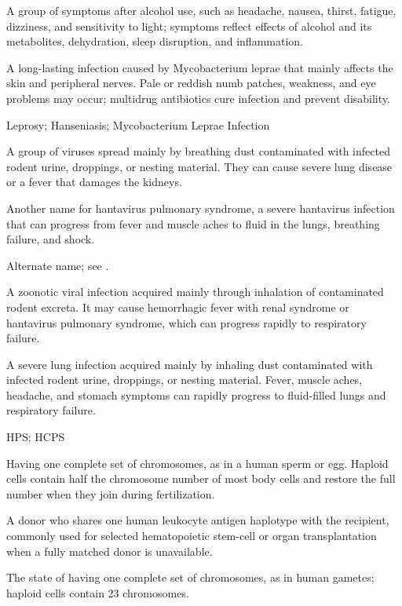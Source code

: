  A group of symptoms after alcohol use, such as headache, nausea, thirst, fatigue, dizziness, and sensitivity to light; symptoms reflect effects of alcohol and its metabolites, dehydration, sleep disruption, and inflammation.

 A long-lasting infection caused by Mycobacterium leprae that mainly affects the skin and peripheral nerves. Pale or reddish numb patches, weakness, and eye problems may occur; multidrug antibiotics cure infection and prevent disability.

\synonyms
Leprosy; Hanseniasis; Mycobacterium Leprae Infection

 A group of viruses spread mainly by breathing dust contaminated with infected rodent urine, droppings, or nesting material. They can cause severe lung disease or a fever that damages the kidneys.

 Another name for hantavirus pulmonary syndrome, a severe hantavirus infection that can progress from fever and muscle aches to fluid in the lungs, breathing failure, and shock.

 Alternate name; see .

 A zoonotic viral infection acquired mainly through inhalation of contaminated rodent excreta. It may cause hemorrhagic fever with renal syndrome or hantavirus pulmonary syndrome, which can progress rapidly to respiratory failure.

 A severe lung infection acquired mainly by inhaling dust contaminated with infected rodent urine, droppings, or nesting material. Fever, muscle aches, headache, and stomach symptoms can rapidly progress to fluid-filled lungs and respiratory failure.

\synonyms
HPS; HCPS

 Having one complete set of chromosomes, as in a human sperm or egg. Haploid cells contain half the chromosome number of most body cells and restore the full number when they join during fertilization.

 A donor who shares one human leukocyte antigen haplotype with the recipient, commonly used for selected hematopoietic stem-cell or organ transplantation when a fully matched donor is unavailable.

 The state of having one complete set of chromosomes, as in human gametes; haploid cells contain 23 chromosomes.

